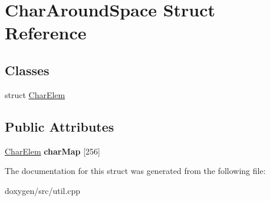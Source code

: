 \hypertarget{struct_char_around_space}{}\section{Char\+Around\+Space Struct Reference}
\label{struct_char_around_space}
\subsection*{Classes}
\begin{DoxyCompactItemize}
\item 
struct \mbox{\hyperlink{struct_char_around_space_1_1_char_elem}{Char\+Elem}}
\end{DoxyCompactItemize}
\subsection*{Public Attributes}
\begin{DoxyCompactItemize}
\item 
\mbox{\label{struct_char_around_space_a9f874e448a5fc7480da8958bc6b90c20}} 
\mbox{\hyperlink{struct_char_around_space_1_1_char_elem}{Char\+Elem}} {\bfseries char\+Map} \mbox{[}256\mbox{]}
\end{DoxyCompactItemize}


The documentation for this struct was generated from the following file\+:\begin{DoxyCompactItemize}
\item 
doxygen/src/util.\+cpp\end{DoxyCompactItemize}
